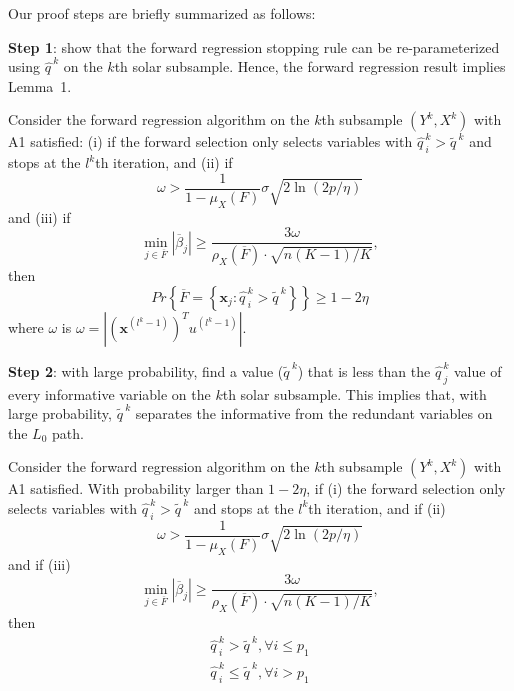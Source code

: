 Our proof steps are briefly summarized as follows:

\bigskip
\noindent
\textbf{Step 1}: show that the forward regression stopping rule can be re-parameterized using $\widehat{q\,}^k$ on the $k$th solar subsample. Hence, the forward regression result \citep[Theorem 2]{zhang09} implies Lemma~1.

\begin{lemma}
  Consider the forward regression algorithm on the $k$th subsample $\left(Y^{k},X^{k}\right)$ with A1 satisfied: (i) if the forward selection only selects variables  with $\widehat{q\,}_{i}^{k}>\widetilde{q\,}^{k}$ and stops at the $l^k$th iteration, and (ii) if
  \[
    \omega>\frac{1}{1-\mu_{X}\left(F\right)}\sigma\sqrt{2\ln\left(2p/\eta\right)}
  \]
  and (iii) if
  \[
    \min_{j\in\overline{F}}\left|\overline{\beta}_{j}\right|\geqslant\frac{3\omega}{\rho_{X}\left(\overline{F}\right)\cdot\sqrt{n\left(K-1\right)/K}},
  \]
  then
  \[
    Pr\left\{ \overline{F}=\left\{ \mathbf{x}_{j}:\widehat{q\,}_{i}^{k}>\widetilde{q\,}^{k}\right\} \right\} \geqslant 1 - 2\eta
  \]
  where $\omega$ is $\omega=\left\vert \left(\mathbf{x}^{\left(l^{k}-1\right)}\right)^T u^{\left(l^{k}-1\right)} \right\vert$.
\end{lemma}

\bigskip
\noindent
\textbf{Step 2}: with large probability, find a value ($\widetilde{q\,}^{k}$) that is less than the $\widehat{q\,}^k_j$ value of every informative variable on the $k$th solar subsample. This implies that, with large probability, $\widetilde{q\,}^{k}$ separates the informative from the redundant variables on the $L_0$ path.

\begin{lemma}
  Consider the forward regression algorithm on the $k$th subsample $\left(Y^{k},X^{k}\right)$ with A1 satisfied. With probability larger than $1-2\eta$,  if (i) the forward selection only selects variables with $\widehat{q\,}_{i}^{k}>\widetilde{q\,}^{k}$ and stops at the $l^k$th iteration, and if (ii)
  \[
    \omega>\frac{1}{1-\mu_{X}\left(F\right)}\sigma\sqrt{2\ln\left(2p/\eta\right)}
  \]
  and if (iii)
  \[
    \min_{j\in\overline{F}}\left|\overline{\beta}_{j}\right|\geqslant\frac{3\omega}{\rho_{X}\left(\overline{F}\right)\cdot\sqrt{n\left(K-1\right)/K}},
  \]
  then
  \begin{eqnarray}
    \widehat{q\,}_{i}^{k}>\widetilde{q\,}^{k},\forall i\leqslant p_{1} \nonumber \\
    \widehat{q\,}_{i}^{k}\leqslant\widetilde{q\,}^{k},\forall i>p_{1}  \nonumber
  \end{eqnarray}
\end{lemma}

